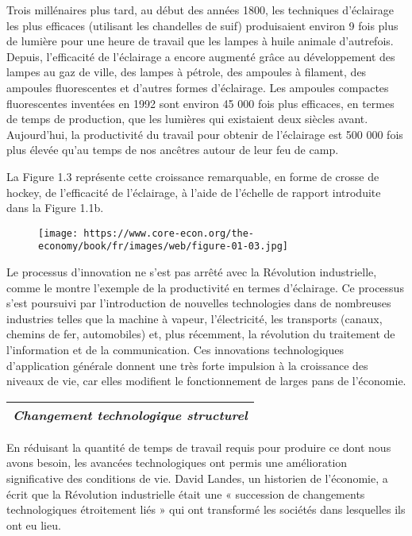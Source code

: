 \documentclass[11pt]{amsart}
\begin{document}
Trois millénaires plus tard, au début des années 1800, les techniques d’éclairage les plus efficaces (utilisant les chandelles de suif) produisaient environ 9 fois plus de lumière pour une heure de travail que les lampes à huile animale d’autrefois. Depuis, l’efficacité de l’éclairage a encore augmenté grâce au développement des lampes au gaz de ville, des lampes à pétrole, des ampoules à filament, des ampoules fluorescentes et d’autres formes d’éclairage. Les ampoules compactes fluorescentes inventées en 1992 sont environ 45 000 fois plus efficaces, en termes de temps de production, que les lumières qui existaient deux siècles avant. Aujourd’hui, la productivité du travail pour obtenir de l’éclairage est 500 000 fois plus élevée qu’au temps de nos ancêtres autour de leur feu de camp.


La Figure 1.3 représente cette croissance remarquable, en forme de crosse de hockey, de l’efficacité de l’éclairage, à l’aide de l’échelle de rapport introduite dans la Figure 1.1b.


\begin{figure}[h]{}
\centering\texttt{[image: https://www.core-econ.org/the-economy/book/fr/images/web/figure-01-03.jpg]}
\caption{}

\end{figure}

Le processus d’innovation ne s’est pas arrêté avec la Révolution industrielle, comme le montre l’exemple de la productivité en termes d’éclairage. Ce processus s’est poursuivi par l’introduction de nouvelles technologies dans de nombreuses industries telles que la machine à vapeur, l’électricité, les transports (canaux, chemins de fer, automobiles) et, plus récemment, la révolution du traitement de l’information et de la communication. Ces innovations technologiques d’application générale donnent une très forte impulsion à la croissance des niveaux de vie, car elles modifient le fonctionnement de larges pans de l’économie.


\begin{center}
\begin{tabular}{|c|}
\hline
\emph{Changement technologique structurel} \\ 
\hline
\end{tabular}
\end{center}

En réduisant la quantité de temps de travail requis pour produire ce dont nous avons besoin, les avancées technologiques ont permis une amélioration significative des conditions de vie. David Landes, un historien de l’économie, a écrit que la Révolution industrielle était une « succession de changements technologiques étroitement liés » qui ont transformé les sociétés dans lesquelles ils ont eu lieu.
\end{document}
